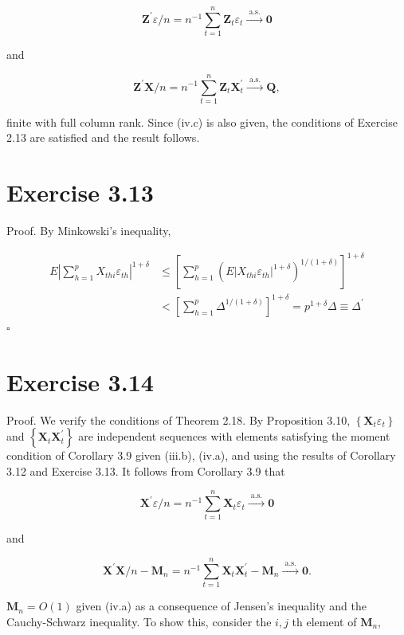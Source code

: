 \documentclass[10pt]{article}
\begin{document}
$$
\mathbf{Z}^{\prime} \varepsilon / n=n^{-1} \sum_{t=1}^{n} \mathbf{Z}_{t} \varepsilon_{t} \xrightarrow{\text { a.s. }} \mathbf{0}
$$

and

$$
\mathbf{Z}^{\prime} \mathbf{X} / n=n^{-1} \sum_{t=1}^{n} \mathbf{Z}_{t} \mathbf{X}_{t}^{\prime} \xrightarrow{\text { a.s. }} \mathbf{Q},
$$

finite with full column rank. Since (iv.c) is also given, the conditions of Exercise 2.13 are satisfied and the result follows.

\section*{Exercise 3.13}
Proof. By Minkowski's inequality,

$$
\begin{aligned}
E\left|\sum_{h=1}^{p} X_{t h i} \varepsilon_{t h}\right|^{1+\delta} & \leq\left[\sum_{h=1}^{p}\left(E\left|X_{t h i} \varepsilon_{t h}\right|^{1+\delta}\right)^{1 /(1+\delta)}\right]^{1+\delta} \\
& <\left[\sum_{h=1}^{p} \Delta^{1 /(1+\delta)}\right]^{1+\delta}=p^{1+\delta} \Delta \equiv \Delta^{\prime}
\end{aligned}
$$ \(\square\)

\section*{Exercise 3.14}
Proof. We verify the conditions of Theorem 2.18. By Proposition 3.10, $\left\{\mathbf{X}_{t} \varepsilon_{t}\right\}$ and $\left\{\mathbf{X}_{t} \mathbf{X}_{t}^{\prime}\right\}$ are independent sequences with elements satisfying the moment condition of Corollary 3.9 given (iii.b), (iv.a), and using the results of Corollary 3.12 and Exercise 3.13. It follows from Corollary 3.9 that

$$
\mathbf{X}^{\prime} \varepsilon / n=n^{-1} \sum_{t=1}^{n} \mathbf{X}_{t} \varepsilon_{t} \xrightarrow{\text { a.s. }} \mathbf{0}
$$

and

$$
\mathbf{X}^{\prime} \mathbf{X} / n-\mathbf{M}_{n}=n^{-1} \sum_{t=1}^{n} \mathbf{X}_{t} \mathbf{X}_{t}^{\prime}-\mathbf{M}_{n} \xrightarrow{\text { a.s. }} \mathbf{0} .
$$

$\mathbf{M}_{n}=O(1)$ given (iv.a) as a consequence of Jensen's inequality and the Cauchy-Schwarz inequality. To show this, consider the $i, j$ th element of $\mathbf{M}_{n}$,
\end{document}
